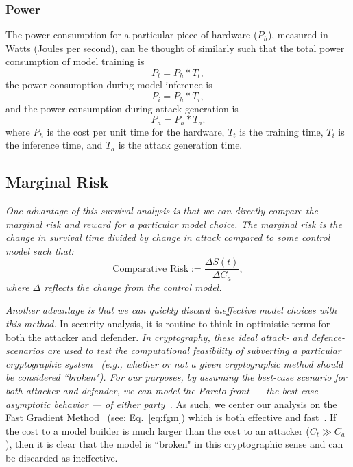 \documentclass[conference]{IEEEtran}
\newcommand{\cm}[1]{\textit{{\color{blue}#1}}}
\begin{document}
\subsubsection{Power}
The power consumption for a particular piece of hardware ($P_h$), measured in Watts (Joules per second), can be thought of similarly such that the total power consumption of model training is
$$
    P_t = P_h *T_t,
    \label{eq:power_training}
$$
the power consumption during model inference is
$$
    P_i = P_h *T_i,
    \label{eq:power_inference}
$$
and the power consumption during attack generation is
$$
    P_a = P_h *T_a.
    \label{eq:power_attack}
$$
where $P_h$ is the cost per unit time for the hardware, $T_t$ is the training time, $T_i$ is the inference time, and $T_a$ is the attack generation time.

\subsection{Marginal Risk}
\cm{One advantage of this survival analysis is that we can directly compare the marginal risk and reward for a particular model choice. The \textit{marginal risk} is the change in survival time divided by change in attack compared to some control model such that:
\[
    \textrm{Comparative~Risk} := \frac{ \Delta S(t)}{\Delta C_a},
\]
where $\Delta$ reflects the change from the control model.}

\cm{Another advantage is that we can quickly discard ineffective model choices with this method.} In security analysis, it is  routine to think in optimistic terms for both the attacker and defender. \cm{In cryptography, these ideal attack- and defence-scenarios are used to test the computational feasibility of subverting a particular cryptographic system~\cite{kamal2017study,leurent2020sha} (\textit{e.g.}, whether or not a given cryptographic method should be considered ``broken"). For our purposes, by assuming the best-case scenario for both attacker and defender, we can model the Pareto front --- the best-case asymptotic behavior --- of either party~\cite{zitzler2008quality}.}
As such, we center our analysis on the Fast Gradient Method~\cite{fgm} (see: Eq.~\ref{eq:fgm}) which is both effective and fast~\cite{meyers}. If the cost to a model builder is much larger than the cost to an attacker ($C_t \gg C_a$), then it is  clear that the model is ``broken" in this cryptographic sense and can be discarded as ineffective. 
\end{document}
